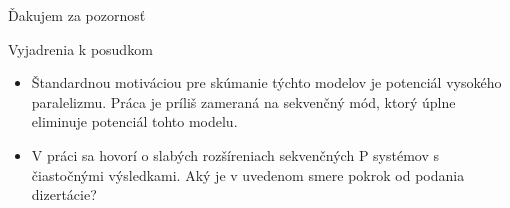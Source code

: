 


\begin{frame}[plain]
\begin{center}
  Ďakujem za pozornosť
\end{center}
\end{frame}

\begin{frame}[t]{Vyjadrenia k posudkom}
  \begin{itemize}
    \item Štandardnou motiváciou pre skúmanie týchto modelov je potenciál vysokého paralelizmu. Práca je príliš zameraná na sekvenčný mód, ktorý úplne eliminuje potenciál tohto modelu.
    \pause
    \item V práci sa hovorí o slabých rozšíreniach sekvenčných P systémov s čiastočnými výsledkami. Aký je v uvedenom smere pokrok od podania dizertácie?
  \end{itemize}
\end{frame}

\newsavebox\mytempbib
\savebox\mytempbib{\parbox{\textwidth}{}}

